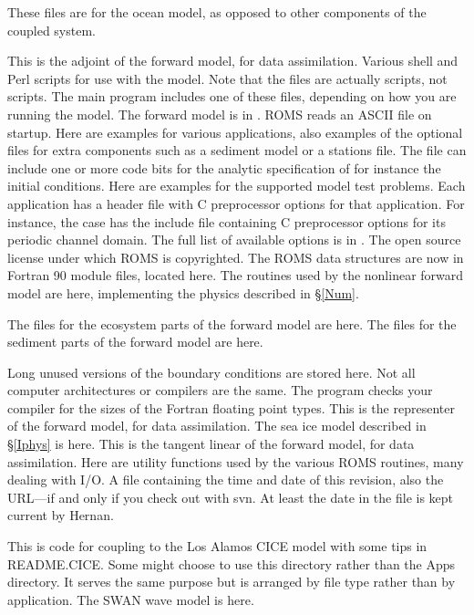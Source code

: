 \begin{klist}
  These files are for the ocean model, as opposed to other components of
  the coupled system.
\begin{klist}
   This is the adjoint of the forward model, for data
    assimilation.
   Various shell and Perl scripts for use with the model.
    Note that the  files are actually  scripts, not
     scripts.
   The main program includes one of these files,
    depending on how you are running the model. The forward model is in
    .
   ROMS reads an ASCII file on startup. Here are
    examples for various applications, also examples of the optional
    files for extra components such as a sediment model or a stations
    file.
   The file  can include one
    or more code bits for the analytic specification of for instance the
    initial conditions. Here are examples for the supported model test
    problems.
   Each application has a header file with C
    preprocessor options for that application. For instance, the
     case has the include file 
    containing C preprocessor options for its periodic channel domain.
    The full list of available options is in .
   The open source license under which ROMS
    is copyrighted.
   The ROMS data structures are now in Fortran 90
    module files, located here.
   The routines used by the nonlinear forward model
    are here, implementing the physics described in \S\ref{Num}.
  \begin{klist}
     The files for the ecosystem parts of the forward
    model are here.
     The files for the sediment parts of the forward
    model are here.
  \end{klist}
   Long unused versions of the boundary conditions
    are stored here.
   Not all computer architectures or compilers are the same.
    The  program checks your compiler for the sizes of the
    Fortran floating point types.
   This is the representer of the forward model, for
    data assimilation.
   The sea ice model described in \S\ref{Iphys} is here.
   This is the tangent linear of the forward model, for data
    assimilation.
   Here are utility functions used by the various
    ROMS routines, many dealing with I/O.
   A file containing the time and date of this
     revision, also the  URL---if and only if you
    check out with svn. At least the date in the file is kept current
    by Hernan.
\end{klist}
   This is code for coupling to the Los Alamos CICE model
    with some tips in README.CICE.
   Some might choose to use this directory rather than
    the Apps directory. It serves the same purpose but is arranged
    by file type rather than by application.
   The SWAN wave model is here.
\end{klist}

